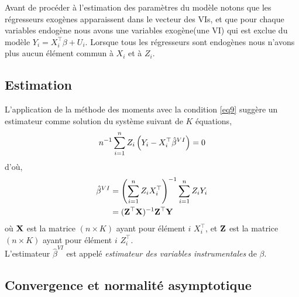 Avant de procéder à l'estimation des paramètres du modèle notons que les régresseurs exogènes 
apparaissent dans le vecteur des VIs, 
et que pour chaque variables endogène nous avons une variables exogène(une VI) qui est 
 exclue du modèle $Y_i = X_i^\top\beta +U_i$. Lorsque tous les régresseurs sont endogènes 
 nous n'avons plus aucun élément commun à $X_i$ et à $Z_i$. 

 \subsection{Estimation}
L'application de la méthode des moments avec la condition \eqref{eq9} suggère un estimateur comme 
solution du système suivant de $K$ équations,
\begin{align*}
n^{-1}\sum_{i=1}^n Z_i\left(Y_i-X_i^\top\hat{\beta}^{VI}\right) = 0
\end{align*}
d'où,
\begin{align*}
\hat{\beta}^{VI} &= \left(\sum_{i=1}^n Z_iX_i^\top\right)^{-1}\sum_{i=1}^n Z_iY_i\\
&=(\mathbf Z^\top\mathbf X)^{-1}\mathbf Z^\top\mathbf Y
\end{align*}
où $\mathbf X$ est la matrice $(n\times K)$ ayant pour élément $i$ $X_i^\top$, et $\mathbf Z$ est la matrice $(n\times K)$ ayant pour élément $i$ $Z_i^\top$.\\
L'estimateur $\hat{\beta}^{VI}$ est appelé \emph{estimateur des variables instrumentales} de $\beta$.

\subsection{Convergence et normalité asymptotique}


